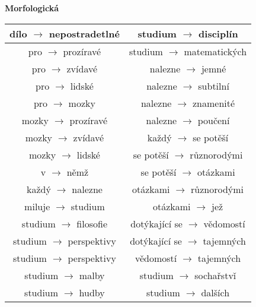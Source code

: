 \documentclass[12pt,a4paper]{article}
\theoremstyle{definition}
\begin{document}
\textbf{Morfologick\'{a}} \\
\begin{tabular}{|c||c|}
\hline
d\'{i}lo $ \rightarrow $  nepostradetln\'{e} & studium $ \rightarrow  $  discipl\'{i}n \\
\hline
pro $ \rightarrow $  proz\'{i}rav\'{e} & studium $ \rightarrow  $  matematick\'{y}ch \\
\hline
pro $ \rightarrow $  zv\'{i}dav\'{e} & nalezne  $ \rightarrow $ jemn\'{e} \\
\hline
pro $ \rightarrow $  lidsk\'{e} & nalezne  $ \rightarrow $ subtiln\'{i} \\
\hline
pro $ \rightarrow $  mozky & nalezne  $ \rightarrow $ znamenit\'{e} \\
\hline
mozky $ \rightarrow $  proz\'{i}rav\'{e} & nalezne  $ \rightarrow $ pou\v{c}en\'{i} \\
\hline
mozky $ \rightarrow $  zv\'{i}dav\'{e} & ka\v{z}d\'{y}  $ \rightarrow $ se pot\v{e}\v{s}\'{i} \\
\hline
mozky $ \rightarrow $  lidsk\'{e} & se pot\v{e}\v{s}\'{i} $ \rightarrow $ r\r{u}znorod\'{y}mi \\
\hline
v $ \rightarrow $  n\v{e}m\v{z} & se pot\v{e}\v{s}\'{i} $ \rightarrow $ ot\'{a}zkami \\
\hline
ka\v{z}d\'{y}  $ \rightarrow $ nalezne & ot\'{a}zkami  $ \rightarrow $ r\r{u}znorod\'{y}mi \\
\hline
miluje $ \rightarrow $ studium & ot\'{a}zkami  $ \rightarrow $ je\v{z} \\
\hline
studium $ \rightarrow $ filosofie & dot\'{y}kaj\'{i}c\'{i} se $ \rightarrow $ v\v{e}domost\'{i} \\
\hline
studium $ \rightarrow $ perspektivy & dot\'{y}kaj\'{i}c\'{i} se $ \rightarrow $ tajemn\'{y}ch \\
\hline
studium $ \rightarrow $ perspektivy & v\v{e}domost\'{i}  $ \rightarrow $ tajemn\'{y}ch \\
\hline
studium $ \rightarrow $ malby & studium  $ \rightarrow $ socha\v{r}stv\v{i}\\
\hline
studium $ \rightarrow $ hudby & studium  $ \rightarrow $ dal\v{s}\'{i}ch \\
\hline

\end{tabular}
\end{document}
